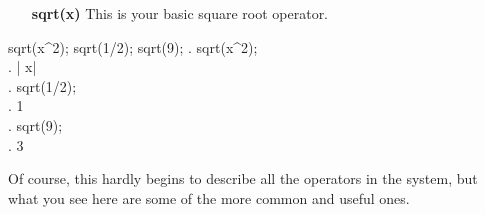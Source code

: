 \vspace{3ex}

\begin{enumerate}
\item [\bf{sqrt(x)}] This is your basic square root operator.
\end{enumerate}

\vspace{3ex}

\beginmaximasession
sqrt(x^2);
sqrt(1/2);
sqrt(9);
\maximatexsession
{}.  sqrt(x^2); \\
.   \left| x\right|  \\
.  sqrt(1/2); \\
.   {{1}} \\
.  sqrt(9); \\
.   3 \\
\endmaximasession

\vspace{3ex}

Of course, this hardly begins to describe all the operators in the 
system, but what you see here are some of the more common and useful ones. 
